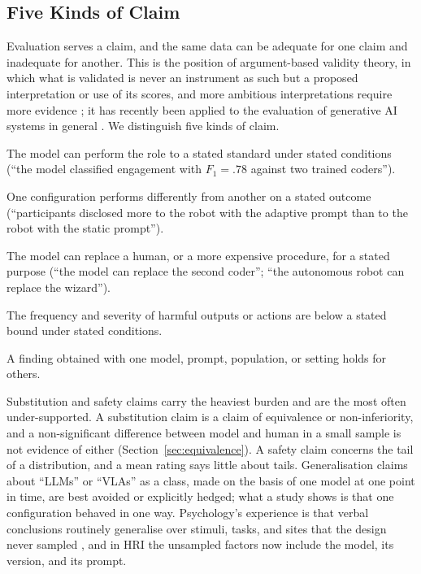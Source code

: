 \subsection{Five Kinds of Claim}
\label{sec:claims}

Evaluation serves a claim, and the same data can be adequate for one claim
and inadequate for another. This is the position of argument-based validity
theory, in which what is validated is never an instrument as such but a
proposed interpretation or use of its scores, and more ambitious
interpretations require more evidence \cite{kane2013validating}; it has
recently been applied to the evaluation of generative AI systems in general
\cite{wallach2025position,salaudeen2025measurement}. We distinguish five
kinds of claim.

\begin{description}[leftmargin=1.2em, style=sameline]
\item[Capability.] The model can perform the role to a stated standard under
stated conditions (``the model classified engagement with $F_1=.78$ against
two trained coders'').
\item[Comparison.] One configuration performs differently from another on a
stated outcome (``participants disclosed more to the robot with the adaptive
prompt than to the robot with the static prompt'').
\item[Substitution.] The model can replace a human, or a more expensive
procedure, for a stated purpose (``the model can replace the second coder'';
``the autonomous robot can replace the wizard'').
\item[Safety.] The frequency and severity of harmful outputs or actions are
below a stated bound under stated conditions.
\item[Generalisation.] A finding obtained with one model, prompt, population,
or setting holds for others.
\end{description}

Substitution and safety claims carry the heaviest burden and are the most
often under-supported. A substitution claim is a claim of equivalence or
non-inferiority, and a non-significant difference between model and human in a
small sample is not evidence of either (Section~\ref{sec:equivalence}). A
safety claim concerns the tail of a distribution, and a mean rating says
little about tails. Generalisation claims about ``LLMs'' or ``VLAs'' as a
class, made on the basis of one model at one point in time, are best avoided
or explicitly hedged; what a study shows is that one configuration behaved in
one way. Psychology's experience is that verbal conclusions routinely
generalise over stimuli, tasks, and sites that the design never sampled
\cite{yarkoni2022generalizability}, and in HRI the unsampled factors now
include the model, its version, and its prompt.

